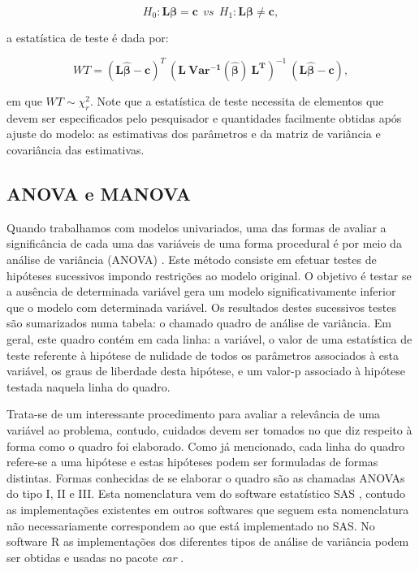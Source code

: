 $$
H_0: \boldsymbol{L}\boldsymbol{\beta} = \boldsymbol{c} \: \:  vs \: \:  H_1: \boldsymbol{L}\boldsymbol{\beta} \neq \boldsymbol{c},
$$

\noindent a estatística de teste é dada por:

$$
WT = (\boldsymbol{L\hat\beta} - \boldsymbol{c})^T \ (\boldsymbol{L \ Var^{-1}(\hat\beta) \ L^T})^{-1} \ (\boldsymbol{L\hat\beta} - \boldsymbol{c}),
$$

\noindent em que $WT \sim \chi^2_r$. Note que a estatística de teste necessita de elementos que devem ser especificados pelo pesquisador e quantidades facilmente obtidas após ajuste do modelo: as estimativas dos parâmetros e da matriz de variância e covariância das estimativas.

\subsection{ANOVA e MANOVA}

Quando trabalhamos com modelos univariados, uma das formas de avaliar a significância de cada uma das variáveis de uma forma procedural é por meio da análise de variância (ANOVA) \citep{anova_fisher}. Este método consiste em efetuar testes de hipóteses sucessivos impondo restrições ao modelo original. O objetivo é testar se a ausência de determinada variável gera um modelo significativamente inferior que o modelo com determinada variável. Os resultados destes sucessivos testes são sumarizados numa tabela: o chamado quadro de análise de variância. Em geral, este quadro contém em cada linha: a variável, o valor de uma estatística de teste referente à hipótese de nulidade de todos os parâmetros associados à esta variável, os graus de liberdade desta hipótese, e um valor-p associado à hipótese testada naquela linha do quadro.

Trata-se de um interessante procedimento para avaliar a relevância de uma variável ao problema, contudo, cuidados devem ser tomados no que diz respeito à forma como o quadro foi elaborado. Como já mencionado, cada linha do quadro refere-se a uma hipótese e estas hipóteses podem ser formuladas de formas distintas. Formas conhecidas de se elaborar o quadro são as chamadas ANOVAs do tipo I, II e III. Esta nomenclatura vem do software estatístico SAS \citep{sas}, contudo as implementações existentes em outros softwares que seguem esta nomenclatura não necessariamente correspondem ao que está implementado no SAS. No software R \citep{softwareR} as implementações dos diferentes tipos de análise de variância podem ser obtidas e usadas no pacote \emph{car} \citep{car}.

